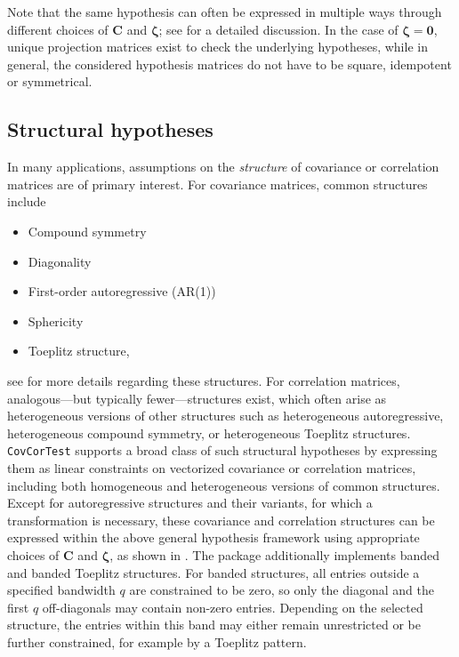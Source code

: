 Note that the same hypothesis can often be expressed in multiple ways through
different choices of \(\boldsymbol{C}\) and \(\boldsymbol{\zeta}\); see
\citep{sattler2023a, sattler2025} for a detailed discussion. In the case of
\(\boldsymbol{\zeta} = \mathbf{0}\), unique projection matrices exist to check the underlying
hypotheses, while in general, the considered hypothesis matrices do not have to
be square, idempotent or symmetrical.

\subsection{Structural hypotheses}\label{structural-hypotheses}

In many applications, assumptions on the \emph{structure} of covariance or
correlation matrices are of primary interest. For covariance matrices, common
structures include

\begin{itemize}
\item
  Compound symmetry
\item
  Diagonality
\item
  First-order autoregressive (AR(1))
\item
  Sphericity
\item
  Toeplitz structure,
\end{itemize}

see \citet{kincaid2005} for more details regarding these structures.
For correlation matrices, analogous---but typically fewer---structures exist, which
often arise as heterogeneous versions of other structures such as heterogeneous
autoregressive, heterogeneous compound symmetry, or heterogeneous Toeplitz
structures. \texttt{CovCorTest} supports a broad class of such structural
hypotheses by expressing them as linear constraints on vectorized covariance or
correlation matrices, including both homogeneous and heterogeneous versions of
common structures. Except for autoregressive structures and their variants, for
which a transformation is necessary, these covariance and correlation
structures can be expressed within the above general hypothesis framework using
appropriate choices of \(\boldsymbol{C}\) and \(\boldsymbol{\zeta}\), as shown in
\citet{sattler2024a}. The package additionally implements banded and banded
Toeplitz structures. For banded structures, all entries outside a specified
bandwidth \(q\) are constrained to be zero, so only the diagonal and the first
\(q\) off-diagonals may contain non-zero entries. Depending on the selected
structure, the entries within this band may either remain unrestricted or be
further constrained, for example by a Toeplitz pattern.


